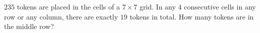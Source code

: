 $235$ tokens are placed in the cells of a $7\times7$ grid. In any $4$ consecutive cells in any row or any column, there are exactly $19$ tokens in total. How many tokens are in the middle row?
